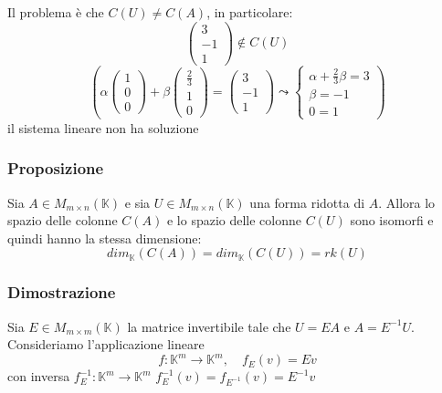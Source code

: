 \documentclass[a4paper]{article}
\theoremstyle{break}
\theoremstyle{break}
\theoremstyle{break}
\theoremstyle{break}
\begin{document}
\begin{example}
  \noindent Il problema è che \( C(U) \neq C(A) \), in particolare:
  \[
  \begin{pmatrix} 
    3\\-1\\1
  \end{pmatrix} \notin C(U)
  \] 
  \[
  \left( \alpha \begin{pmatrix} 1\\0\\0 \end{pmatrix} +
    \beta \begin{pmatrix} \frac{2}{3}\\1\\0 \end{pmatrix}
    =
    \begin{pmatrix} 3\\-1\\1 \end{pmatrix} 
    \leadsto \begin{cases}
      \alpha + \frac{2}{3}\beta = 3\\
      \beta = -1\\
      0 = 1
    \end{cases}
  \right) 
  \] 
  il sistema lineare non ha soluzione
\end{example}

\subsubsection{Proposizione}
Sia \( A \in M_{m \times n}(\mathbb{K}) \) e sia \( U \in M_{m \times n}(\mathbb{K}) \) una
forma ridotta di \( A \). Allora lo spazio delle colonne \( C(A) \) e lo spazio
delle colonne \( C(U) \) sono isomorfi e quindi hanno la stessa dimensione:
\[
  dim_{\mathbb{K}}(C(A)) = dim_{\mathbb{K}}(C(U)) = rk(U)
\] 

\subsubsection{Dimostrazione}
Sia \( E \in M_{m \times m}(\mathbb{K}) \) la matrice invertibile tale che \( U = EA \) e \( A = E^{-1}U \).
Consideriamo l'applicazione lineare 
\[ f: \mathbb{K}^m \to \mathbb{K}^m, \quad f_E(v) = Ev \]
con inversa \( f_E^{-1}: \mathbb{K}^m \to \mathbb{K}^m \) \( f_E^{-1}(v) = f_{E^{-1}}(v) = E^{-1}v \) 
\begin{figure}[H]
  \centering
\end{figure}
\end{document}
